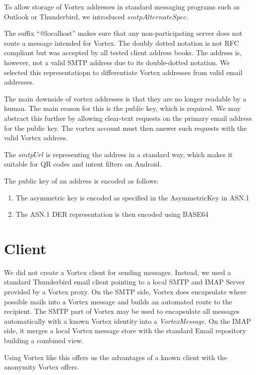 To allow storage of Vortex addresses in standard messaging programs such as Outlook or Thunderbird, we introduced $smtpAlternateSpec$. 

The suffix ``@localhost'' makes sure that any non-participating server does not route a message intended for Vortex. The doubly dotted notation is not RFC compliant but was accepted by all tested client address books. The address is, however, not a valid SMTP address due to its double-dotted notation. We selected this representatiopn to differentiate Vortex addresses from valid email addresses.

The main downside of vortex addresses is that they are no longer readable by a human. The main reason for this is the public key, which is required. We may abstract this further by allowing clear-text requests on the primary email address for the public key. The vortex account must then answer such requests with the valid Vortex address.

The $smtpUrl$ is representing the address in a standard way, which makes it suitable for QR codes and intent filters on Android.

The public key of an address is encoded as follows:
\begin{enumerate}
	\item The asymmetric key is encoded as specified in the AsymmetricKey in ASN.1
	\item The ASN.1 DER representation is then encoded using BASE64
\end{enumerate}    

\section{Client}
We did not create a Vortex client for sending messages. Instead, we used a standard Thunderbird email client pointing to a local SMTP and IMAP Server provided by a Vortex proxy. On the SMTP side, Vortex does encapsulate where possible mails into a Vortex message and builds an automated route to the recipient. The SMTP part of Vortex may be used to encapsulate all messages automatically with a known Vortex identity into a \emph{VortexMessage}. On the IMAP side, it merges a local Vortex message store with the standard Email repository building a combined view.

Using Vortex like this offers us the advantages of a known client with the anonymity Vortex offers.

